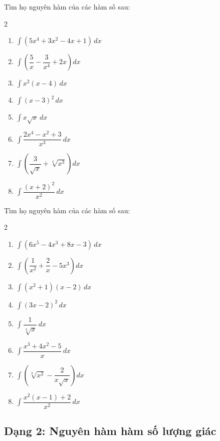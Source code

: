 \documentclass[12pt]{article}
\begin{document}
	\begin{btvang}
		Tìm họ nguyên hàm của các hàm số sau:
		\begin{multicols}{2}
			\begin{enumerate}[label=\alph*)]
				\item $\displaystyle \int (5x^4 + 3x^2 - 4x + 1) \,dx$
				\item $\displaystyle \int \left( \dfrac{5}{x} - \dfrac{3}{x^4} + 2x \right) dx$
				\item $\displaystyle \int x^2(x - 4) \,dx$
				\item $\displaystyle \int (x - 3)^2 \,dx$
				\item $\displaystyle \int x\sqrt{x} \,dx$
				\item $\displaystyle \int \dfrac{2x^4 - x^2 + 3}{x^3} \,dx$
				\item $\displaystyle \int \left( \dfrac{3}{\sqrt{x}} + \sqrt[4]{x^3} \right) dx$
				\item $\displaystyle \int \dfrac{(x+2)^2}{x^2} \,dx$
			\end{enumerate}
		\end{multicols}
	\end{btvang}
	
	\begin{btdo}
		Tìm họ nguyên hàm của các hàm số sau:
		\begin{multicols}{2}
			\begin{enumerate}[label=\alph*)]
				\item $\displaystyle \int (6x^5 - 4x^3 + 8x - 3) \,dx$
				\item $\displaystyle \int \left( \dfrac{1}{x^2} + \dfrac{2}{x} - 5x^3 \right) dx$
				\item $\displaystyle \int (x^2 + 1)(x - 2) \,dx$
				\item $\displaystyle \int (3x - 2)^2 \,dx$
				\item $\displaystyle \int \dfrac{1}{\sqrt[3]{x}} \,dx$
				\item $\displaystyle \int \dfrac{x^3 + 4x^2 - 5}{x} \,dx$
				\item $\displaystyle \int \left( \sqrt[3]{x^2} - \dfrac{2}{x\sqrt{x}} \right) dx$
				\item $\displaystyle \int \dfrac{x^2(x-1) + 2}{x^2} \,dx$
			\end{enumerate}
		\end{multicols}
	\end{btdo}
	
	\subsection{Dạng 2: Nguyên hàm hàm số lượng giác}
	
\end{document}
